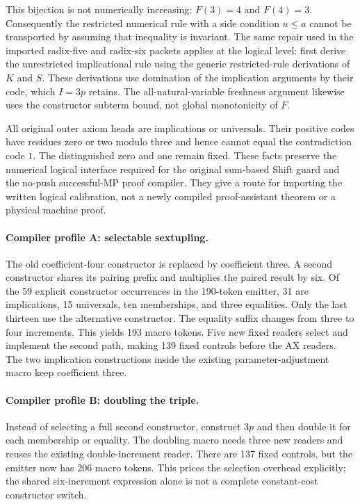 \documentclass[11pt]{article}
\begin{document}
This bijection is not numerically increasing: $F(3)=4$ and $F(4)=3$.
Consequently the restricted numerical rule with a side condition $u\leq a$
cannot be transported by assuming that inequality is invariant. The same
repair used in the imported radix-five and radix-six packets applies at the
logical level: first derive the unrestricted implicational rule using the
generic restricted-rule derivations of $K$ and $S$. These derivations use
domination of the implication arguments by their code, which $I=3p$ retains.
The all-natural-variable freshness argument likewise uses the constructor
subterm bound, not global monotonicity of $F$.

All original outer axiom heads are implications or universals. Their positive
codes have residues zero or two modulo three and hence cannot equal the
contradiction code $1$. The distinguished zero and one remain fixed. These
facts preserve the numerical logical interface required for the original
sum-based Shift guard and the no-push successful-MP proof compiler. They give
a route for importing the written logical calibration, not a newly compiled
proof-assistant theorem or a physical machine proof.

\paragraph{Compiler profile A: selectable sextupling.}
The old coefficient-four constructor is replaced by coefficient three. A
second constructor shares its pairing prefix and multiplies the paired result
by six. Of the 59 explicit constructor occurrences in the 190-token emitter,
31 are implications, 15 universals, ten memberships, and three equalities.
Only the last thirteen use the alternative constructor. The equality suffix
changes from three to four increments. This yields 193 macro tokens. Five
new fixed readers select and implement the second path, making 139 fixed
controls before the AX readers. The two implication constructions inside
the existing parameter-adjustment macro keep coefficient three.

\paragraph{Compiler profile B: doubling the triple.}
Instead of selecting a full second constructor, construct $3p$ and then double
it for each membership or equality. The doubling macro needs three new readers
and reuses the existing double-increment reader. There are 137 fixed controls,
but the emitter now has 206 macro tokens. This prices the selection overhead
explicitly; the shared six-increment expression alone is not a complete
constant-cost constructor switch.
\end{document}
